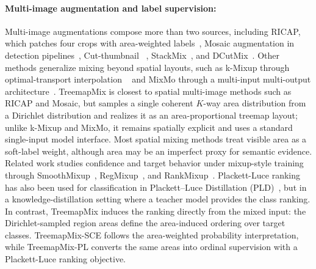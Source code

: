 \paragraph{Multi-image augmentation and label supervision:}
Multi-image augmentations compose more than two sources, including RICAP, which
patches four crops with area-weighted labels~\citep{
takahashiDataAugmentationUsing2020}, Mosaic augmentation in detection
pipelines~\citep{bochkovskiyYOLOv4OptimalSpeed2020}, Cut-thumbnail
~\citep{Xie_2021}, StackMix~\citep{chen2022stackmix}, and
DCutMix~\citep{jeong2022dcutmix}. Other methods generalize mixing beyond
spatial layouts, such as k-Mixup through optimal-transport interpolation
~\citep{greenewald2023kmixupregularizationdeeplearning} and MixMo through a
multi-input multi-output architecture~\citep{rame2021mixmo}. TreemapMix is
closest to spatial multi-image methods such as RICAP and Mosaic, but samples a
single coherent $K$-way area distribution from a Dirichlet distribution and
realizes it as an area-proportional treemap layout; unlike k-Mixup and MixMo,
it remains spatially explicit and uses a standard single-input model interface.
Most spatial mixing methods treat visible area as a soft-label
weight, although area may be an imperfect proxy for semantic evidence. Related
work studies confidence and target behavior under mixup-style training through
SmoothMixup~\citep{jeong2021smoothmixtrainingconfidencecalibratedsmoothed},
RegMixup~\citep{pinto2023regmixupmixupregularizersurprisingly}, and
RankMixup~\citep{noh2023rankmixuprankingbasedmixuptraining}. Plackett-Luce
ranking has also been used for classification in Plackett--Luce Distillation (PLD)~\citep{pld}, but in a
knowledge-distillation setting where a teacher model provides the class ranking.
In contrast, TreemapMix induces the ranking directly from the mixed input: the
Dirichlet-sampled region areas define the area-induced ordering over target
classes. TreemapMix-SCE follows the area-weighted probability interpretation,
while TreemapMix-PL converts the same areas into ordinal supervision with a
Plackett-Luce ranking objective.
